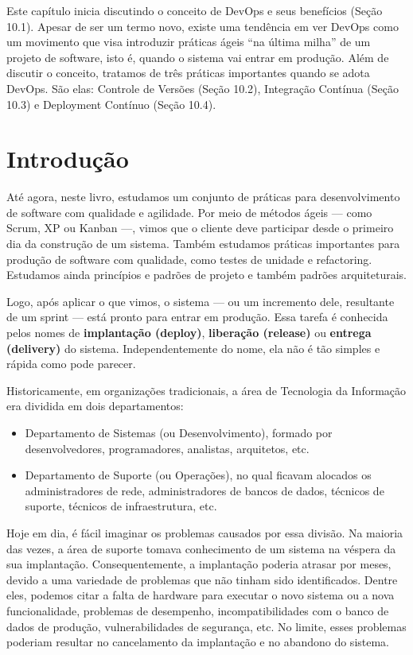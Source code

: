 \documentclass[
  11pt,
  twoside]{book}
\begin{document}
Este capítulo inicia discutindo o conceito de DevOps e seus benefícios
(Seção 10.1). Apesar de ser um termo novo, existe uma tendência em ver
DevOps como um movimento que visa introduzir práticas ágeis ``na última
milha'' de um projeto de software, isto é, quando o sistema vai entrar
em produção. Além de discutir o conceito, tratamos de três práticas
importantes quando se adota DevOps. São elas: Controle de Versões (Seção
10.2), Integração Contínua (Seção 10.3) e Deployment Contínuo (Seção
10.4).

\hypertarget{introduuxe7uxe3o-7}{%
\section{Introdução}\label{introduuxe7uxe3o-7}}


Até agora, neste livro, estudamos um conjunto de práticas para
desenvolvimento de software com qualidade e agilidade. Por meio de
métodos ágeis --- como Scrum, XP ou Kanban ---, vimos que o cliente deve
participar desde o primeiro dia da construção de um sistema. Também
estudamos práticas importantes para produção de software com qualidade,
como testes de unidade e refactoring. Estudamos ainda princípios e
padrões de projeto e também padrões arquiteturais.

Logo, após aplicar o que vimos, o sistema --- ou um incremento dele,
resultante de um sprint --- está pronto para entrar em produção. Essa
tarefa é conhecida pelos nomes de \textbf{implantação (deploy)},
\textbf{liberação (release)} ou \textbf{entrega (delivery)} do sistema.
Independentemente do nome, ela não é tão simples e rápida como pode
parecer.

Historicamente, em organizações tradicionais, a área de Tecnologia da
Informação era dividida em dois departamentos:

\begin{itemize}
\item
  Departamento de Sistemas (ou Desenvolvimento), formado por
  desenvolvedores, programadores, analistas, arquitetos, etc.
\item
  Departamento de Suporte (ou Operações), no qual ficavam alocados os
  administradores de rede, administradores de bancos de dados, técnicos
  de suporte, técnicos de infraestrutura, etc.
\end{itemize}

Hoje em dia, é fácil imaginar os problemas causados por essa divisão. Na
maioria das vezes, a área de suporte tomava conhecimento de um sistema
na véspera da sua implantação. Consequentemente, a implantação poderia
atrasar por meses, devido a uma variedade de problemas que não tinham
sido identificados. Dentre eles, podemos citar a falta de hardware para
executar o novo sistema ou a nova funcionalidade, problemas de
desempenho, incompatibilidades com o banco de dados de produção,
vulnerabilidades de segurança, etc. No limite, esses problemas poderiam
resultar no cancelamento da implantação e no abandono do sistema.
\end{document}
